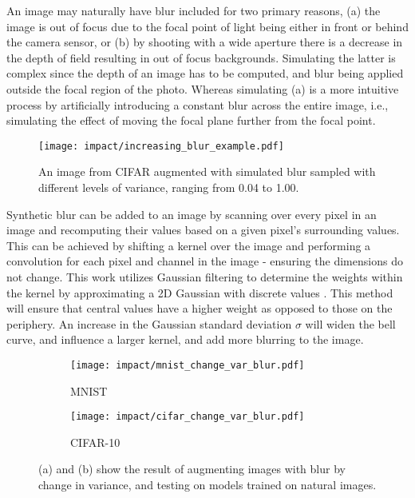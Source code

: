 \documentclass[conference]{IEEEtran}
\begin{document}
An image may naturally have blur included for two primary reasons, (a) the image is out of focus due to the focal point of light being either in front or behind the camera sensor, or (b) by shooting with a wide aperture there is a decrease in the depth of field resulting in out of focus backgrounds. Simulating the latter is complex since the depth of an image has to be computed, and blur being applied outside the focal region of the photo. Whereas simulating (a) is a more intuitive process by artificially introducing a constant blur across the entire image, i.e., simulating the effect of moving the focal plane further from the focal point.

\begin{figure}[!t]
    \centering
    \texttt{[image: impact/increasing\_blur\_example.pdf]}
    \captionsetup{width=0.90\columnwidth}
    \caption{An image from CIFAR augmented with simulated blur sampled with different levels of variance, ranging from 0.04 to 1.00.}
    \label{fig:increasing_blur}
\end{figure}

Synthetic blur can be added to an image by scanning over every pixel in an image and recomputing their values based on a given pixel's surrounding values. This can be achieved by shifting a kernel over the image and performing a convolution for each pixel and channel in the image - ensuring the dimensions do not change. This work utilizes Gaussian filtering to determine the weights within the kernel by approximating a 2D Gaussian with discrete values \cite{gaussian_filtering}. This method will ensure that central values have a higher weight as opposed to those on the periphery. An increase in the Gaussian standard deviation $\sigma$ will widen the bell curve, and influence a larger kernel, and add more blurring to the image.

\begin{figure}[!b]
    \centering
    \begin{subfigure}{0.45\columnwidth}
        \centering
        \texttt{[image: impact/mnist\_change\_var\_blur.pdf]}
        \caption{MNIST}
    \end{subfigure}
    \begin{subfigure}{0.45\columnwidth}
        \centering
        \texttt{[image: impact/cifar\_change\_var\_blur.pdf]}
        \caption{CIFAR-10}
    \end{subfigure}
    \captionsetup{width=0.90\columnwidth}
    \caption{(a) and (b) show the result of augmenting images with blur by change in variance, and testing on models trained on natural images.}
    \label{fig:impact_blur_change}
\end{figure}
\end{document}
